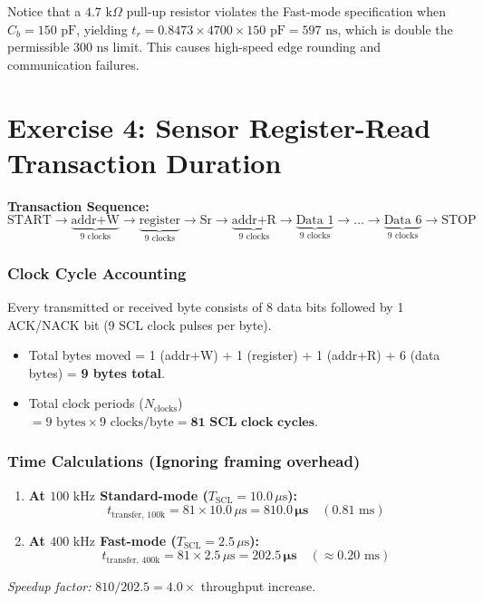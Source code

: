 \documentclass[11pt,a4paper]{article}
\begin{document}
\begin{troublebox}
Notice that a $4.7\text{ k}\Omega$ pull-up resistor violates the Fast-mode specification when $C_b = 150\text{ pF}$, yielding $t_r = 0.8473 \times 4700 \times 150\text{ pF} = 597\text{ ns}$, which is double the permissible $300\text{ ns}$ limit. This causes high-speed edge rounding and communication failures.
\end{troublebox}

\newpage
\section*{Exercise 4: Sensor Register-Read Transaction Duration}
\textbf{Transaction Sequence:}
\begin{equation*}
\text{START} \to \underbrace{\text{addr+W}}_{9\text{ clocks}} \to \underbrace{\text{register}}_{9\text{ clocks}} \to \text{Sr} \to \underbrace{\text{addr+R}}_{9\text{ clocks}} \to \underbrace{\text{Data 1}}_{9\text{ clocks}} \to \dots \to \underbrace{\text{Data 6}}_{9\text{ clocks}} \to \text{STOP}
\end{equation*}

\subsubsection*{Clock Cycle Accounting}
Every transmitted or received byte consists of 8 data bits followed by 1 ACK/NACK bit (9 SCL clock pulses per byte).
\begin{itemize}
    \item Total bytes moved = 1 (addr+W) + 1 (register) + 1 (addr+R) + 6 (data bytes) = \textbf{9 bytes total}.
    \item Total clock periods ($N_{\text{clocks}}$) $= 9\text{ bytes} \times 9\text{ clocks/byte} = \mathbf{81\text{ SCL clock cycles}}$.
\end{itemize}

\subsubsection*{Time Calculations (Ignoring framing overhead)}
\begin{enumerate}
    \item[\textbf{(a)}] \textbf{At $100\text{ kHz}$ Standard-mode ($T_{\text{SCL}} = 10.0\,\mu\text{s}$):}
    \begin{equation}
    t_{\text{transfer, 100k}} = 81 \times 10.0\,\mu\text{s} = \mathbf{810.0\,\mu\text{s}} \quad (0.81\text{ ms})
    \end{equation}
    \item[\textbf{(b)}] \textbf{At $400\text{ kHz}$ Fast-mode ($T_{\text{SCL}} = 2.5\,\mu\text{s}$):}
    \begin{equation}
    t_{\text{transfer, 400k}} = 81 \times 2.5\,\mu\text{s} = \mathbf{202.5\,\mu\text{s}} \quad (\approx 0.20\text{ ms})
    \end{equation}
\end{enumerate}
\textit{Speedup factor:} $810 / 202.5 = \mathbf{4.0\times}$ throughput increase.
\end{document}
